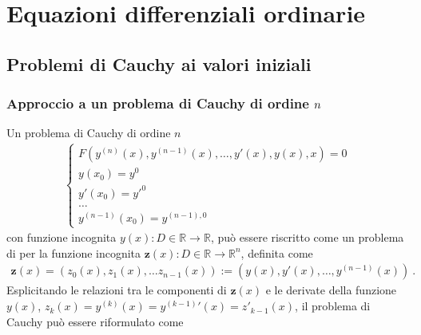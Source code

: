 \documentclass[letterpaper,10pt,english]{jupyterBook}
\begin{document}
\section{Equazioni differenziali ordinarie}
\label{\detokenize{ch/numerics/ode:equazioni-differenziali-ordinarie}}\label{\detokenize{ch/numerics/ode::doc}}
\sphinxstepscope


\subsection{Problemi di Cauchy ai valori iniziali}
\label{\detokenize{ch/numerics/ode-cauchy:problemi-di-cauchy-ai-valori-iniziali}}\label{\detokenize{ch/numerics/ode-cauchy::doc}}

\subsubsection{Approccio a un problema di Cauchy di ordine \protect\(n\protect\)}
\label{\detokenize{ch/numerics/ode-cauchy:approccio-a-un-problema-di-cauchy-di-ordine-n}}
\sphinxAtStartPar
Un problema di Cauchy di ordine \(n\)
\begin{equation*}
\begin{split}\begin{cases}
  F(y^{(n)}(x), y^{(n-1)}(x), \dots, y'(x), y(x), x) = 0 \\
  y(x_0) = y^0 \\
  y'(x_0) = y'^0 \\
  \dots \\
  y^{(n-1)}(x_0) = y^{(n-1),0}
\end{cases}\end{split}
\end{equation*}
\sphinxAtStartPar
con funzione incognita \(y(x): D \in \mathbb{R} \rightarrow \mathbb{R}\), può essere riscritto come un problema di  per la funzione incognita \(\mathbf{z}(x): D \in \mathbb{R} \rightarrow \mathbb{R}^n\), definita come
\begin{equation*}
\begin{split}\mathbf{z}(x) = (z_0(x), z_1(x), \dots z_{n-1}(x)) := (y(x), y'(x), \dots, y^{(n-1)}(x)) \ .\end{split}
\end{equation*}
\sphinxAtStartPar
Esplicitando le relazioni tra le componenti di \(\mathbf{z}(x)\) e le derivate della funzione \(y(x)\), \(z_{k}(x) = y^{(k)}(x) = {y^{(k-1)}}'(x) = z'_{k-1}(x)\), il problema di Cauchy può essere riformulato come
\end{document}
